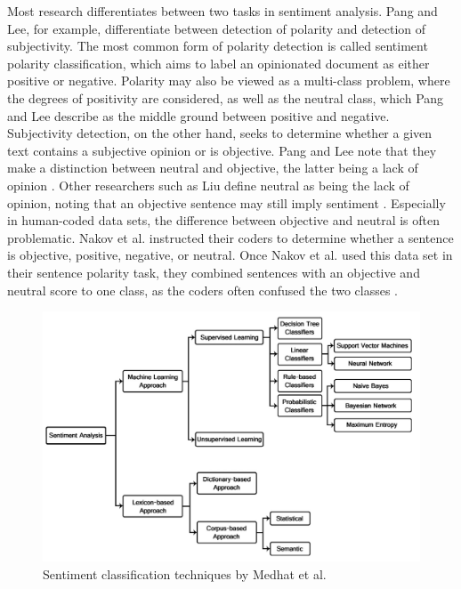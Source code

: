 Most research differentiates between two tasks in sentiment analysis. Pang and Lee, for example, differentiate between detection of polarity and detection of subjectivity. The most common form of polarity detection is called sentiment polarity classification, which aims to label an opinionated document as either positive or negative. Polarity may also be viewed as a multi-class problem, where the degrees of positivity are considered, as well as the neutral class, which Pang and Lee describe as the middle ground between positive and negative. Subjectivity detection, on the other hand, seeks to determine whether a given text contains a subjective opinion or is objective. Pang and Lee note that they make a distinction between neutral and objective, the latter being a lack of opinion \cite{DBLP:journals/ftir/PangL07}. Other researchers such as Liu define neutral as being the lack of opinion, noting that an objective sentence may still imply sentiment \cite{liu_2015}. Especially in human-coded data sets, the difference between objective and neutral is often problematic. Nakov et al. instructed their coders to determine whether a sentence is objective, positive, negative, or neutral. Once Nakov et al. used this data set in their sentence polarity task, they combined sentences with an objective and neutral score to one class, as the coders often confused the two classes \cite{nakov-etal-2013-semeval}.

\begin{figure}
    \centering
    \includegraphics[scale=0.3]{Images/classification_techniques.png}
    \caption{Sentiment classification techniques by Medhat et al. \cite{MEDHAT20141093}}
    \label{fig:classifiers}
\end{figure}

